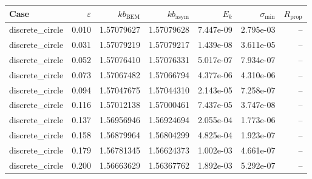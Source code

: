 \begin{tabular}{lrrrrrr}
\hline
Case & $\varepsilon$ & $kb_{\mathrm{BEM}}$ & $kb_{\mathrm{asym}}$ & $E_k$ & $\sigma_{\min}$ & $R_{\mathrm{prop}}$ \\
\hline
discrete_circle & 0.010 & 1.57079627 & 1.57079628 & 7.447e-09 & 2.795e-03 & -- \\
discrete_circle & 0.031 & 1.57079219 & 1.57079217 & 1.439e-08 & 3.611e-05 & -- \\
discrete_circle & 0.052 & 1.57076410 & 1.57076331 & 5.017e-07 & 7.934e-07 & -- \\
discrete_circle & 0.073 & 1.57067482 & 1.57066794 & 4.377e-06 & 4.310e-06 & -- \\
discrete_circle & 0.094 & 1.57047675 & 1.57044310 & 2.143e-05 & 7.258e-07 & -- \\
discrete_circle & 0.116 & 1.57012138 & 1.57000461 & 7.437e-05 & 3.747e-08 & -- \\
discrete_circle & 0.137 & 1.56956946 & 1.56924694 & 2.055e-04 & 1.773e-06 & -- \\
discrete_circle & 0.158 & 1.56879964 & 1.56804299 & 4.825e-04 & 1.923e-07 & -- \\
discrete_circle & 0.179 & 1.56781345 & 1.56624373 & 1.002e-03 & 4.661e-07 & -- \\
discrete_circle & 0.200 & 1.56663629 & 1.56367762 & 1.892e-03 & 5.292e-07 & -- \\
\hline
\end{tabular}